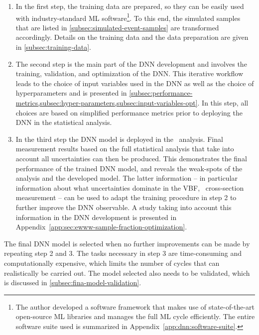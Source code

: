\begin{enumerate}
    \item In the first step, the training data are prepared, so they can be easily used with industry-standard ML software\footnote{The author developed a software framework that makes use of state-of-the-art open-source ML libraries and manages the full ML cycle efficiently.
    The entire software suite used is summarized in Appendix~\ref{app:dnn:software-suite}.}. To this end, the simulated samples that are listed in \cref{subsec:simulated-event-samples} are transformed accordingly. Details on the training data and the data preparation are given in \cref{subsec:training-data}.
    \item The second step is the main part of the DNN development and involves the training, validation, and optimization of the DNN.
          This iterative workflow leads to the choice of input variables used in the DNN as well as the choice of hyperparameters and is presented in \cref{subsec:performance-metrics,subsec:hyper-parameters,subsec:input-variables-opt}.
          In this step, all choices are based on simplified performance metrics prior to deploying the DNN in the statistical analysis.
    \item In the third step the DNN model is deployed in the \HWW\ analysis. Final measurement results based on the full statistical analysis that take into account all uncertainties can then be produced. This demonstrates the final performance of the trained DNN model, and reveals the weak-spots of the analysis and the developed model. The latter information -- in particular information about what uncertainties dominate in the VBF, \HWW\ cross-section measurement -- can be used to adapt the training procedure in step 2 to further improve the DNN observable. A study taking into account this information in the DNN development is presented in Appendix~\ref{app:sec:ewww-sample-fraction-optimization}.
\end{enumerate}
The final DNN model is selected when no further improvements can be made by repeating step 2 and 3. The tasks necessary in step 3 are time-consuming and computationally expensive, which limits the number of cycles that can realistically be carried out. 
The model selected also needs to be validated, which is discussed in \cref{subsec:fina-model-validation}.

